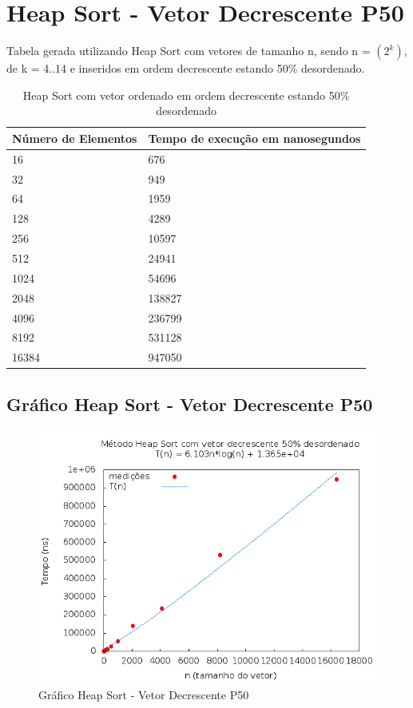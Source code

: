 \documentclass[12pt,a4paper,twoside]{report}
\begin{document}
\section{Heap Sort - Vetor Decrescente P50}
Tabela gerada utilizando Heap Sort com vetores de tamanho n, sendo n = $(2^k)$, de k = 4..14 e inseridos em ordem decrescente estando 50\% desordenado.
\begin{table}[H]
\centering
\caption{Heap Sort com vetor ordenado em ordem decrescente estando 50\% desordenado}
\label{my-label}
\begin{tabular}{|l|l|}
\hline
\multicolumn{1}{|c|}{\textbf{Número de Elementos}} & \multicolumn{1}{c|}{\textbf{Tempo de execução em nanosegundos}} \\ \hline
16 & 676 \\ \hline
32 & 949 \\ \hline
64 & 1959 \\ \hline
128 & 4289 \\ \hline
256 & 10597 \\ \hline
512 & 24941 \\ \hline
1024 & 54696 \\ \hline
2048 & 138827 \\ \hline
4096 & 236799 \\ \hline
8192 & 531128 \\ \hline
16384 & 947050 \\ \hline
\end{tabular}
\end{table}

\subsection{Gráfico Heap Sort - Vetor Decrescente P50}
\begin{figure}[H]
    \centering
    \includegraphics[width=0.7\linewidth]{graficos/HeapSort/vIntDecrescenteP50/vIntDecrescenteP50.png}
  \caption{Gráfico Heap Sort - Vetor Decrescente P50}
\end{figure}
\end{document}
